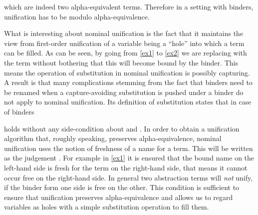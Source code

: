 \begin{isabellebody}
\begin{isamarkuptext}
  

  \noindent
  which are indeed two alpha-equivalent terms. Therefore in a setting with binders,
  unification has to be modulo alpha-equivalence.

  What is interesting about nominal unification
  is the fact that it maintains the view from first-order unification of a variable being a 
  ``hole'' into which a term can be filled. As can be seen, by going from \eqref{ex1}
  to \eqref{ex2} we are replacing  with the term  without bothering
  that this  will become bound by the binder. This means 
  the operation of substitution in nominal
  unification is possibly capturing. A result is that many complications stemming from
  the fact that binders need to be renamed when a capture-avoiding substitution is 
  pushed under a binder do not apply
  to nominal unification. Its definition of substitution states that in case of binders

  \begin{center}
  \end{center}

  \noindent
  holds without any side-condition about  and . In order to 
  obtain a unification algorithm 
  that, roughly speaking, preserves alpha-equivalence,
  nominal unification uses the notion of freshness of a name for a term. This will be 
  written as the judgement . For example in
  \eqref{ex1} it is ensured that the bound name  
  on the left-hand side is fresh for the term on the right-hand side, that means it cannot occur free
  on the right-hand side. In general
  two abstraction terms will \emph{not} unify, if the binder form one side is free
  on the other. This condition is sufficient to ensure that unification preserves alpha-equivalence
  and allows us to regard variables as holes with a simple substitution operation to fill them.


\end{isamarkuptext}
\end{isabellebody}
